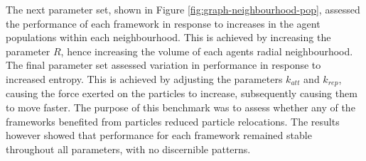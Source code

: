   The next parameter set, shown in Figure \ref{fig:graph-neighbourhood-pop}, assessed the performance of each framework in response to increases in the agent populations within each neighbourhood. This is achieved by increasing the parameter $R$, hence increasing the volume of each agents radial neighbourhood.
  The final parameter set assessed variation in performance in response to increased entropy. This is achieved by adjusting the parameters $k_{att}$ and $k_{rep}$, causing the force exerted on the particles to increase, subsequently causing them to move faster.
  The purpose of this benchmark was to assess whether any of the frameworks benefited from particles reduced particle relocations. The results however showed that performance for each framework remained stable throughout all parameters, with no discernible patterns.
